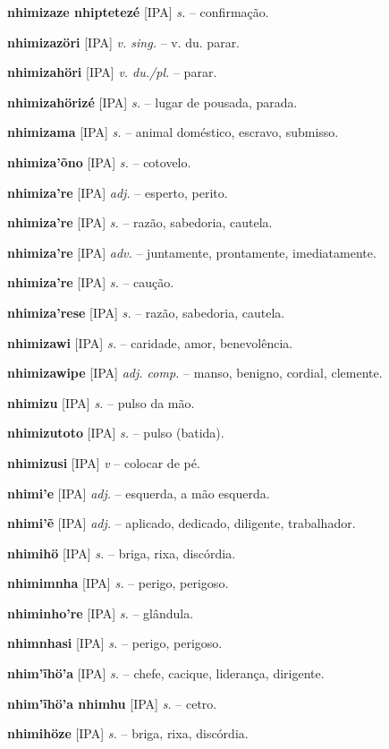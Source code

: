 \textbf{nhimizaze nhiptetezé} [IPA] \textit{s.} -- confirmação.

\textbf{nhimizazöri} [IPA] \textit{v. sing.} -- v. du. parar.

\textbf{nhimizahöri} [IPA] \textit{v. du./pl.} -- parar.

\textbf{nhimizahörizé} [IPA] \textit{s.} -- lugar de pousada, parada.

\textbf{nhimizama} [IPA] \textit{s.} -- animal doméstico, escravo, submisso.

\textbf{nhimiza'õno} [IPA] \textit{s.} -- cotovelo.

\textbf{nhimiza're} [IPA] \textit{adj.} -- esperto, perito.

\textbf{nhimiza're} [IPA] \textit{s.} -- razão, sabedoria, cautela.

\textbf{nhimiza're} [IPA] \textit{adv.} -- juntamente, prontamente, imediatamente.

\textbf{nhimiza're} [IPA] \textit{s.} -- caução.

\textbf{nhimiza'rese} [IPA] \textit{s.} -- razão, sabedoria, cautela.

\textbf{nhimizawi} [IPA] \textit{s.} -- caridade, amor, benevolência.

\textbf{nhimizawipe} [IPA] \textit{adj. comp.} -- manso, benigno, cordial, clemente.

\textbf{nhimizu} [IPA] \textit{s.} -- pulso da mão.

\textbf{nhimizutoto} [IPA] \textit{s.} -- pulso (batida).

\textbf{nhimizusi} [IPA] \textit{v} -- colocar de pé.

\textbf{nhimi'e} [IPA] \textit{adj.} -- esquerda, a mão esquerda.

\textbf{nhimi'ẽ} [IPA] \textit{adj.} -- aplicado, dedicado, diligente, trabalhador.

\textbf{nhimihö} [IPA] \textit{s.} -- briga, rixa, discórdia.

\textbf{nhimimnha} [IPA] \textit{s.} -- perigo, perigoso.

\textbf{nhiminho're} [IPA] \textit{s.} -- glândula.

\textbf{nhimnhasi} [IPA] \textit{s.} -- perigo, perigoso.

\textbf{nhim'ĩhö'a} [IPA] \textit{s.} -- chefe, cacique, liderança, dirigente.

\textbf{nhim'ĩhö'a nhimhu} [IPA] \textit{s.} -- cetro.

\textbf{nhimihöze} [IPA] \textit{s.} -- briga, rixa, discórdia.

